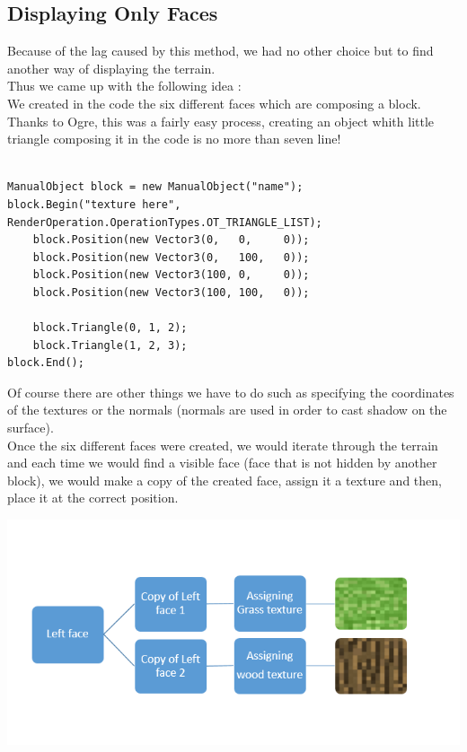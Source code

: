 \documentclass[article]{report}         %
\begin{document}
        \subsection{Displaying Only Faces}
          Because of the lag caused by this method, we had no other choice but to find another way of displaying the terrain.\\
          Thus we came up with the following idea :\\
          We created in the code the six different faces which are composing a block.\\
          Thanks to Ogre, this was a fairly easy process, creating an object whith little triangle composing it in the code is no more than seven line!
          \begin{lstlisting}

ManualObject block = new ManualObject("name");
block.Begin("texture here", RenderOperation.OperationTypes.OT_TRIANGLE_LIST);
    block.Position(new Vector3(0,   0,     0));
    block.Position(new Vector3(0,   100,   0));
    block.Position(new Vector3(100, 0,     0));
    block.Position(new Vector3(100, 100,   0));

    block.Triangle(0, 1, 2);
    block.Triangle(1, 2, 3);
block.End();
        \end{lstlisting}

        Of course there are other things we have to do such as specifying the coordinates of the textures or the normals (normals are used in order to cast shadow on the surface).\\
 
        Once the six different faces were created, we would iterate through the terrain and each time we would find a visible face (face that is not hidden by another block), we would make a copy of the created face, assign it a texture and then, place it at the correct position.

        \begin{center}
            \includegraphics[width=16cm]{images/Display.png}
        \end{center}
\end{document}
